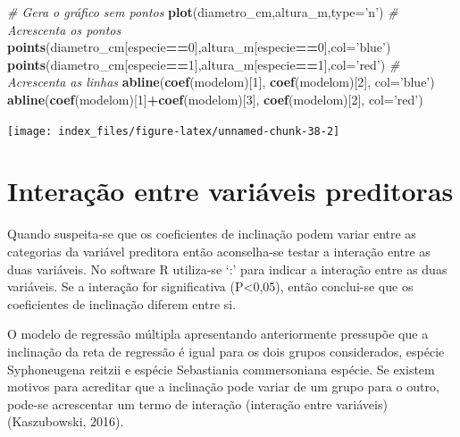 \documentclass[12pt,brazil,oneside]{book}
\newenvironment{Shaded}{\begin{snugshade}}{\end{snugshade}}
\newcommand{\CommentTok}[1]{\textcolor[rgb]{0.56,0.35,0.01}{\textit{#1}}}
\newcommand{\DataTypeTok}[1]{\textcolor[rgb]{0.13,0.29,0.53}{#1}}
\newcommand{\DecValTok}[1]{\textcolor[rgb]{0.00,0.00,0.81}{#1}}
\newcommand{\KeywordTok}[1]{\textcolor[rgb]{0.13,0.29,0.53}{\textbf{#1}}}
\newcommand{\NormalTok}[1]{#1}
\newcommand{\OperatorTok}[1]{\textcolor[rgb]{0.81,0.36,0.00}{\textbf{#1}}}
\newcommand{\StringTok}[1]{\textcolor[rgb]{0.31,0.60,0.02}{#1}}
\begin{document}
\begin{Shaded}
\begin{Highlighting}[]
\CommentTok{# Gera o gráfico sem pontos}
\KeywordTok{plot}\NormalTok{(diametro_cm,altura_m,}\DataTypeTok{type=}\StringTok{'n'}\NormalTok{) }
\CommentTok{# Acrescenta os pontos}
\KeywordTok{points}\NormalTok{(diametro_cm[especie}\OperatorTok{==}\DecValTok{0}\NormalTok{],altura_m[especie}\OperatorTok{==}\DecValTok{0}\NormalTok{],}\DataTypeTok{col=}\StringTok{'blue'}\NormalTok{)}
\KeywordTok{points}\NormalTok{(diametro_cm[especie}\OperatorTok{==}\DecValTok{1}\NormalTok{],altura_m[especie}\OperatorTok{==}\DecValTok{1}\NormalTok{],}\DataTypeTok{col=}\StringTok{'red'}\NormalTok{)}
\CommentTok{# Acrescenta as linhas}
\KeywordTok{abline}\NormalTok{(}\KeywordTok{coef}\NormalTok{(modelom)[}\DecValTok{1}\NormalTok{], }\KeywordTok{coef}\NormalTok{(modelom)[}\DecValTok{2}\NormalTok{], }\DataTypeTok{col=}\StringTok{'blue'}\NormalTok{)}
\KeywordTok{abline}\NormalTok{(}\KeywordTok{coef}\NormalTok{(modelom)[}\DecValTok{1}\NormalTok{]}\OperatorTok{+}\KeywordTok{coef}\NormalTok{(modelom)[}\DecValTok{3}\NormalTok{], }\KeywordTok{coef}\NormalTok{(modelom)[}\DecValTok{2}\NormalTok{], }\DataTypeTok{col=}\StringTok{'red'}\NormalTok{)}
\end{Highlighting}
\end{Shaded}

\begin{center}\texttt{[image: index\_files/figure-latex/unnamed-chunk-38-2]} \end{center}

\hypertarget{interacao-entre-variaveis-preditoras}{%
\section{Interação entre variáveis
preditoras}\label{interacao-entre-variaveis-preditoras}}

Quando suspeita-se que os coeficientes de inclinação podem variar entre
as categorias da variável preditora então aconselha-se testar a
interação entre as duas variáveis. No software R utiliza-se `:' para
indicar a interação entre as duas variáveis. Se a interação for
significativa (P\textless{}0,05), então conclui-se que os coeficientes
de inclinação diferem entre si.

O modelo de regressão múltipla apresentando anteriormente pressupõe que
a inclinação da reta de regressão é igual para os dois grupos
considerados, espécie Syphoneugena reitzii e espécie Sebastiania
commersoniana espécie. Se existem motivos para acreditar que a
inclinação pode variar de um grupo para o outro, pode-se acrescentar um
termo de interação (interação entre variáveis) (Kaszubowski, 2016).
\end{document}
